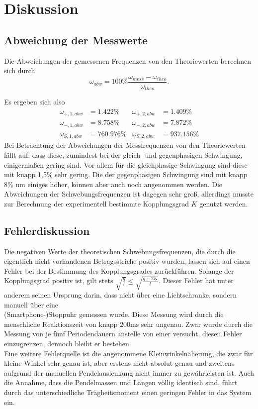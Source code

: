 \section{Diskussion}
\label{sec:Diskussion}

\subsection{Abweichung der Messwerte}
Die Abweichungen der gemessenen Frequenzen von den Theoriewerten berechnen sich durch
\begin{equation}
    ω_{abw} = 100\% \frac{ω_{mess}-ω_{theo}}{ω_{theo}} \text{.}
\end{equation}

Es ergeben sich also
\begin{align}
ω_{+,1,abw} & = 1.422\%   & ω_{+,2,abw} & = 1.409\% \\
ω_{-,1,abw} & = 8.758\%   & ω_{-,2,abw} & = 7.872\%\\
ω_{S,1,abw} & = 760.976\% & ω_{S,2,abw} & = 937.156\%
\end{align}
Bei Betrachtung der Abweichungen der Messfrequenzen von den Theoriewerten fällt auf, dass diese, zumindest
bei der gleich- und gegenphasigen Schwingung, einigermaßen gering sind. Vor allem für die gleichphasige Schwingung
sind diese mit knapp 1,5\% sehr gering. Die der gegenphasigen Schwingung sind mit knapp 8\% um einiges höher, können aber auch noch angenommen werden.
Die Abweichungen der Schwebungsfrequenzen ist dagegen sehr groß, allerdings musste zur Berechnung der experimentell
bestimmte Kopplungsgrad $K$ genutzt werden.

\subsection{Fehlerdiskussion}

Die negativen Werte der theoretischen Schwebungsfrequenzen, die durch die eigentlich nicht vorhandenen Betragsstriche positiv wurden, lassen sich auf einen Fehler bei der Bestimmung des Kopplungsgrades zurückführen.
Solange der Kopplungsgrad positiv ist, gilt stets $\sqrt{\frac{g}{l}}\leq \sqrt{\frac{g+2K}{l}}$.
Dieser Fehler hat unter anderem seinen Ursprung darin, dass nicht über eine Lichtschranke, sondern manuell über eine \\
(Smartphone-)Stoppuhr gemessen wurde. Diese Messung wird durch die menschliche Reaktionszeit von knapp $200 \unit{\milli\second}$ sehr ungenau.
Zwar wurde durch die Messung von je fünf Periodendauern anstelle von einer versucht, diesen Fehler einzugrenzen, dennoch bleibt er bestehen. \\

Eine weitere Fehlerquelle ist die angenommene Kleinwinkelnäherung, die zwar für kleine Winkel sehr genau ist, aber erstens nicht absolut genau und zweitens aufgrund der manuellen
Pendelauslenkung nicht immer zu gewährleisten ist. Auch die Annahme, dass die Pendelmassen und Längen völlig identisch sind, führt durch das unterschiedliche Trägheitsmoment einen geringen Fehler
in das System ein.
